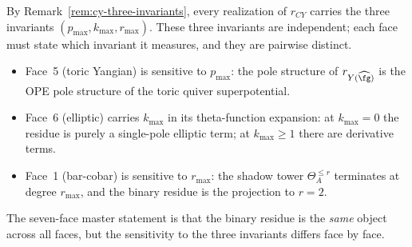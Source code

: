 \begin{remark}
\label{rem:three-invariants-cross-faces}
By Remark~\ref{rem:cy-three-invariants}, every realization of $r_{CY}$
carries the three invariants $(p_{\max}, k_{\max}, r_{\max})$.
These three invariants are independent; each face must state which
invariant it measures, and they are pairwise distinct.
\begin{itemize}
\item Face~5 (toric Yangian) is sensitive to $p_{\max}$: the pole
structure of $r_{Y(\widehat{\fg})}$ is the OPE pole structure of the
toric quiver superpotential.
\item Face~6 (elliptic) carries $k_{\max}$ in its theta-function
expansion: at $k_{\max} = 0$ the residue is purely a single-pole
elliptic term; at $k_{\max} \geq 1$ there are derivative terms.
\item Face~1 (bar-cobar) is sensitive to $r_{\max}$: the shadow tower
$\Theta_A^{\leq r}$ terminates at degree $r_{\max}$, and the binary
residue is the projection to $r = 2$.
\end{itemize}
The seven-face master statement is that the binary residue is the
\emph{same} object across all faces, but the sensitivity to the three
invariants differs face by face.
\end{remark}


